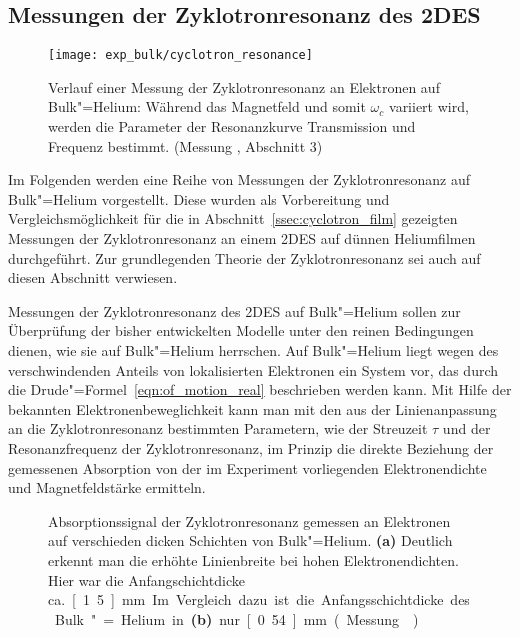 \subsection{Messungen der Zyklotronresonanz des 2DES}

\begin{figure}[h!tbp]
	\texttt{[image: exp\_bulk/cyclotron\_resonance]}\hfill%
	\begin{minipage}[b]{\textwidth-\midwidth-\tabcolsep}
	\caption[Verlauf einer Messung der Zyklotronresonanz]{Verlauf einer Messung der Zyklotronresonanz an Elektronen auf Bulk"=Helium: Während das Magnetfeld und somit $\omega_c$ variiert wird, werden die Parameter der Resonanzkurve Transmission  und Frequenz  bestimmt. (Messung , Abschnitt 3)}
		\label{fig:cyclotron_resonance}
	\end{minipage}
\end{figure}
Im Folgenden werden eine Reihe von Messungen der Zyklotronresonanz auf Bulk"=Helium vorgestellt. Diese wurden als Vorbereitung und Vergleichsmöglichkeit für die in Abschnitt~\ref{ssec:cyclotron_film} gezeigten Messungen der Zyklotronresonanz an einem 2DES auf dünnen Heliumfilmen  durchgeführt. Zur grundlegenden Theorie der Zyklotronresonanz sei auch auf diesen Abschnitt verwiesen.

Messungen der Zyklotronresonanz des 2DES auf Bulk"=Helium sollen zur Überprüfung der bisher entwickelten Modelle unter den reinen Bedingungen dienen, wie sie auf Bulk"=Helium herrschen. Auf Bulk"=Helium liegt wegen des verschwindenden Anteils von lokalisierten Elektronen ein System vor, das durch die Drude"=Formel~\eqref{eqn:of_motion_real} beschrieben werden kann. Mit Hilfe der bekannten Elektronenbeweglichkeit kann man mit den aus der Linienanpassung an die Zyklotronresonanz bestimmten Parametern, wie der Streuzeit $\tau$ und der Resonanzfrequenz der Zyklotronresonanz, im Prinzip die direkte Beziehung der gemessenen Absorption von der im Experiment vorliegenden Elektronendichte und Magnetfeldstärke ermitteln. 

\begin{figure}[h!tbp]
	\begin{center}
	\end{center}
	\caption[Absorption des 2DES bei Zyklotronresonanz]{Absorptionssignal der Zyklotronresonanz gemessen an Elektronen auf verschieden dicken Schichten von Bulk"=Helium. {\bfseries (a)} Deutlich erkennt man die erhöhte Linienbreite bei hohen Elektronendichten. Hier war die Anfangschichtdicke ca.\ \unit[1.5]{mm}. Im Vergleich dazu ist die Anfangsschichtdicke des Bulk"=Helium in {\bfseries (b)} nur \unit[0.54]{mm}. (Messung )}
	\label{fig:bulk_cr_abs}
\end{figure}

